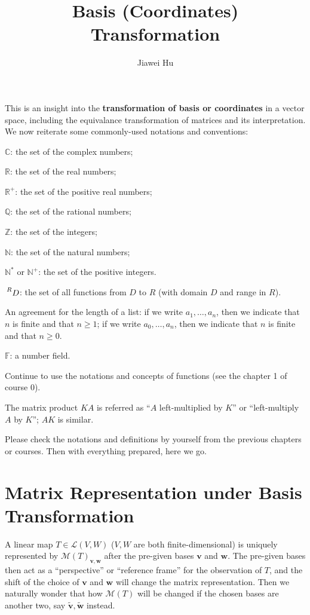 \documentclass{article}
\title{\LARGE \textbf{Basis (Coordinates) Transformation}}
\author{\large Jiawei Hu}
\newcommand{\basisTilde}[1]{\tilde{\pmb{#1}}}
\begin{document}
\maketitle

This is an insight into the \textbf{transformation of basis or coordinates} in a vector space, including the equivalance transformation of matrices and its interpretation.
We now reiterate some commonly-used notations and conventions:
\begin{compactenum}
    \item $\mathbb{C}$: the set of the complex numbers;
    \item $\mathbb{R}$: the set of the real numbers;
    \item $\mathbb{R}^+$: the set of the positive real numbers;
    \item $\mathbb{Q}$: the set of the rational numbers;
    \item $\mathbb{Z}$: the set of the integers;
    \item $\mathbb{N}$: the set of the natural numbers;
    \item $\mathbb{N^\ast}$ or $\mathbb{N}^+$: the set of the positive integers.
    \item $\sideset{^R}{}{\mathop{D}}$: the set of all functions from $D$ to $R$ (with domain $D$ and range in $R$).
    \item An agreement for the length of a list: if we write $a_1, \dots, a_n$, then we indicate that $n$ is finite and that $n\geq 1$; if we write $a_0, \dots, a_n$, then we indicate that $n$ is finite and that $n\geq 0$.
    \item $\mathbb{F}$: a number field.
    \item Continue to use the notations and concepts of functions (see the chapter 1 of course 0).
    \item The matrix product $KA$ is referred as ``$A$ left-multiplied by $K$'' or ``left-multiply $A$ by $K$''; $AK$ is similar.
\end{compactenum} 
Please check the notations and definitions by yourself from the previous chapters or courses. Then with everything prepared, here we go.

\section{Matrix Representation under Basis Transformation}
A linear map $T\in\mathcal{L}(V,W)$ ($V, W$ are both finite-dimensional) is uniquely represented by $\mathcal{M}(T)_{\pmb{v}, \pmb{w}}$ after the pre-given bases $\pmb{v}$ and $\pmb{w}$. The pre-given bases then act as a ``perspective'' or ``reference frame'' for the observation of $T$, and the shift of the choice of $\pmb{v}$ and $\pmb{w}$ will change the matrix representation. Then we naturally wonder that how $\mathcal{M}(T)$ will be changed if the chosen bases are another two, say $\basisTilde{v}, \basisTilde{w}$ instead.
\end{document}
